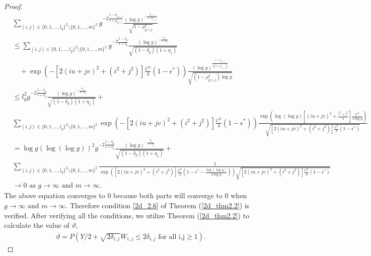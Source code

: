 \documentclass{article}
\begin{document}
\begin{appendices}
\begin{proof}
		\begin{equation*}
			\begin{aligned}
				&\sum_{(i,j) \in \{0,1,...,l_g\}^2 \setminus \{0,1,...,m\}^2} g^{-2\frac{1-\rho_{g,i,j}}{1+\rho_{g,i,j}}} \frac{\left( \log g \right)^{-\frac{\rho_{g,i,j}}{1+\rho_{g,i,j}}}}{\sqrt{1-\rho^2_{g,i,j}}} \\
				&\leq\sum_{(i,j) \in \{0,1,...,l_g\}^2 \setminus \{0,1,...,m\}^2} g^{-2\frac{1-\delta_y}{1+\delta_y}}\frac{\left( \log g \right)^{-\frac{\eta_1}{1+\eta_1}}}{\sqrt{(1-\delta_y)(1+\eta_1)}}\\
				&\quad+\exp\left(-[2(iu+jv)^2+(i^2+j^2)]\frac{C^2}{4}(1-\epsilon^*) \right) \frac{\left( \log g \right)^{\frac{1-\rho_{g,i,j}}{2(1+\rho_{g,i,j})}}}{\sqrt{(1-\rho^2_{g,i,j})\log g}}   \\
				&\leq l_g^2 g^{-2\frac{1-\delta_y}{1+\delta_y}}\frac{\left( \log g \right)^{-\frac{\eta_1}{1+\eta_1}}}{\sqrt{(1-\delta_y)(1+\eta_1)}}+\\
				&\sum_{(i,j) \in \{0,1,...,l_g\}^2 \setminus \{0,1,...,m\}^2} \exp\left(-[2(iu+jv)^2+(i^2+j^2)]\frac{C^2}{4}(1-\epsilon^*) \right) \frac{\exp\left( \log(\log g) {[(iu+jv)^2+\frac{i^2+j^2}{4}]\frac{C^2}{2\log g}}\right)}{\sqrt{[2(iu+jv)^2+(i^2+j^2)]\frac{C^2}{4}(1-\epsilon^*)}}\\
				&=\log g (\log(\log g))^2g^{-2\frac{1-\delta_y}{1+\delta_y}}\frac{\left( \log g \right)^{-\frac{\eta_1}{1+\eta_1}}}{\sqrt{(1-\delta_y)(1+\eta_1)}}+\\
				&\sum_{(i,j) \in \{0,1,...,l_g\}^2 \setminus \{0,1,...,m\}^2} \frac{1}{\exp\left([2(iu+jv)^2+(i^2+j^2)]\frac{C^2}{4}(1-\epsilon^*-\frac{\log(\log g)}{2\log g}) \right)\sqrt{[2(iu+jv)^2+(i^2+j^2)]\frac{C^2}{4}(1-\epsilon^*)}}\\
				&\rightarrow 0 \text{ as }g\rightarrow\infty \text{ and } m\rightarrow\infty.
			\end{aligned}
		\end{equation*}
		The above equation converges to 0 because both parts will converge to 0 when $g\rightarrow\infty \text{ and } m\rightarrow\infty$. Therefore condition \eqref{2d_2.6} of Theorem (\ref{2d_thm2.2}) is verified. After verifying all the conditions, we utilize Theorem (\ref{2d_thm2.2}) to calculate the value of $\vartheta$,
		\begin{equation*}
			\begin{aligned}
				\vartheta=P(Y/2+\sqrt{2\delta_{i,j}}W_{i,j}\leq2\delta_{i,j}\text{ for all i,j}\geq1).
			\end{aligned} 
		\end{equation*}

\end{proof}
\end{appendices}
\end{document}
